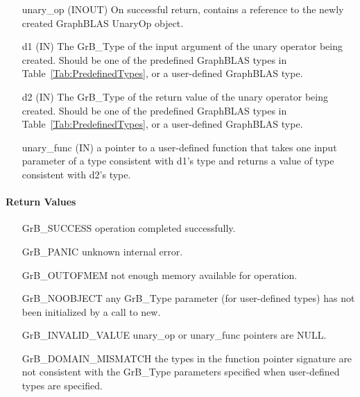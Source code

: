 \begin{itemize}[leftmargin=1.1in]
    \item[{\sf unary\_op}] ({\sf INOUT}) On successful return, contains a
                           reference to the newly created GraphBLAS UnaryOp object.
    \item[{\sf d1}] ({\sf IN})  The {\sf GrB\_Type} of the input 
                           argument of the unary operator being created.  Should be 
                           one of the predefined GraphBLAS types in 
                           Table~\ref{Tab:PredefinedTypes}, or a user-defined GraphBLAS type.
    \item[{\sf d2}] ({\sf IN})  The {\sf GrB\_Type} of the return value of the unary 
                           operator being created.  Should be one of the predefined 
                           GraphBLAS types in Table~\ref{Tab:PredefinedTypes}, or a 
                           user-defined GraphBLAS type.
    \item[{\sf unary\_func}] ({\sf IN})  a pointer to a user-defined function that takes 
                           one input parameter of a type consistent with {\sf d1}'s type
                           and returns a value of type consistent with {\sf d2}'s type.  
\end{itemize}

\paragraph{Return Values}

\begin{itemize}[leftmargin=2.1in]
\item[{\sf GrB\_SUCCESS}]           operation completed successfully.
\item[{\sf GrB\_PANIC}]             unknown internal error.
\item[{\sf GrB\_OUTOFMEM}]          not enough memory available for operation.
\item[{\sf GrB\_NOOBJECT}]          any {\sf GrB\_Type} parameter (for
                                    user-defined types) has not been
                                    initialized by a call to {\sf new}.
\item[{\sf GrB\_INVALID\_VALUE}]    {\sf unary\_op} or {\sf unary\_func}
                                    pointers are {\sf NULL}.
\item[{\sf GrB\_DOMAIN\_MISMATCH}]  the types in the function pointer signature
                                    are not consistent with the {\sf GrB\_Type}
                                    parameters specified when user-defined types
                                    are specified. 
\end{itemize}

